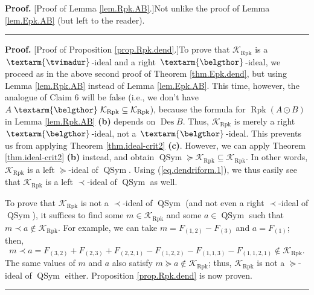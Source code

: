 \documentclass[numbers=enddot,12pt,final,onecolumn,notitlepage]{scrartcl}%
\theoremstyle{definition}
\newenvironment{proof}[1][Proof]{\noindent\textbf{#1.} }{\ \rule{0.5em}{0.5em}}
\newenvironment{verlong}{}{}
\newcommand{\tvi}{\left. \textarm{\tvimadur} \right.}
\newcommand{\bel}{\left. \textarm{\belgthor} \right.}
\begin{document}
\begin{verlong}
\begin{proof}
[Proof of Lemma \ref{lem.Rpk.AB}.]Not unlike the proof of Lemma
\ref{lem.Epk.AB} (but left to the reader).
\end{proof}

\begin{proof}
[Proof of Proposition \ref{prop.Rpk.dend}.]To prove that $\mathcal{K}%
_{\operatorname*{Rpk}}$ is a $\tvi$-ideal and a right $\bel$-ideal, we proceed
as in the above second proof of Theorem \ref{thm.Epk.dend}, but using Lemma
\ref{lem.Rpk.AB} instead of Lemma \ref{lem.Epk.AB}. This time, however, the
analogue of Claim 6 will be false (i.e., we don't have $A\bel\mathcal{K}%
_{\operatorname*{Rpk}}\subseteq\mathcal{K}_{\operatorname*{Rpk}}$), because
the formula for $\operatorname*{Rpk}\left(  A\odot B\right)  $ in Lemma
\ref{lem.Rpk.AB} \textbf{(b)} depends on $\operatorname*{Des}B$. Thus,
$\mathcal{K}_{\operatorname*{Rpk}}$ is merely a right $\bel$-ideal, not a
$\bel$-ideal. This prevents us from applying Theorem \ref{thm.ideal-crit2}
\textbf{(c)}. However, we can apply Theorem \ref{thm.ideal-crit2} \textbf{(b)}
instead, and obtain $\operatorname*{QSym}\left.  \succeq\right.
\mathcal{K}_{\operatorname*{Rpk}}\subseteq\mathcal{K}_{\operatorname*{Rpk}}$.
In other words, $\mathcal{K}_{\operatorname*{Rpk}}$ is a left $\left.
\succeq\right.  $-ideal of $\operatorname*{QSym}$. Using
(\ref{eq.dendriform.1}), we thus easily see that $\mathcal{K}%
_{\operatorname*{Rpk}}$ is a left $\left.  \prec\right.  $-ideal of
$\operatorname*{QSym}$ as well.

To prove that $\mathcal{K}_{\operatorname*{Rpk}}$ is not a $\left.
\prec\right.  $-ideal of $\operatorname*{QSym}$ (and not even a right $\left.
\prec\right.  $-ideal of $\operatorname*{QSym}$), it suffices to find some
$m\in\mathcal{K}_{\operatorname*{Rpk}}$ and some $a\in\operatorname*{QSym}$
such that $m\left.  \prec\right.  a\notin\mathcal{K}_{\operatorname*{Rpk}}$.
For example, we can take $m=F_{\left(  1,2\right)  }-F_{\left(  3\right)  }$
and $a=F_{\left(  1\right)  }$; then,
\[
m\left.  \prec\right.  a=F_{\left(  3,2\right)  }+F_{\left(  2,3\right)
}+F_{\left(  2,2,1\right)  }-F_{\left(  1,2,2\right)  }-F_{\left(
1,1,3\right)  }-F_{\left(  1,1,2,1\right)  }\notin\mathcal{K}%
_{\operatorname*{Rpk}}.
\]
The same values of $m$ and $a$ also satisfy $m\left.  \succeq\right.
a\notin\mathcal{K}_{\operatorname*{Rpk}}$; thus, $\mathcal{K}%
_{\operatorname*{Rpk}}$ is not a $\left.  \succeq\right.  $-ideal of
$\operatorname*{QSym}$ either. Proposition \ref{prop.Rpk.dend} is now proven.
\end{proof}


\end{verlong}
\end{document}
